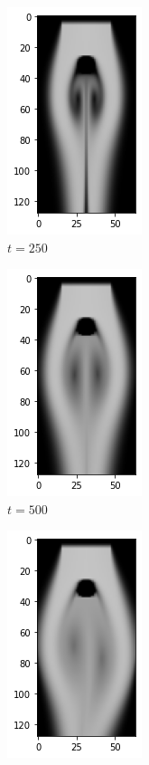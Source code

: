 \documentclass[a4paper,12pt,twoside]{report}
\begin{document}
\begin{figure}
	\centering
	\begin{subfigure}{0.18\textwidth}
		\centering
		\includegraphics[scale=0.5]{karmanflow/source_density_000250.png}
		\caption{$t=250$}
	\end{subfigure}
	\begin{subfigure}{0.18\textwidth}
		\centering
		\includegraphics[scale=0.5]{karmanflow/source_density_000500.png}
		\caption{$t=500$}
	\end{subfigure}
	\begin{subfigure}{0.18\textwidth}
		\centering
		\includegraphics[scale=0.5]{karmanflow/source_density_001000.png}

\end{subfigure}
\end{figure}
\end{document}
